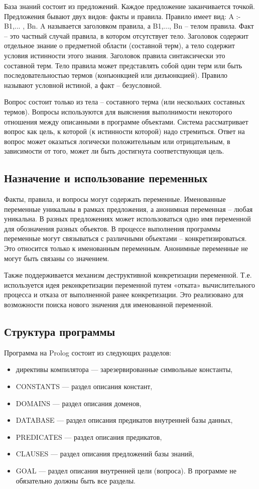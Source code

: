 \documentclass[a4paper,12pt]{article}
\begin{document}
База знаний состоит из предложений. Каждое предложение заканчивается точкой. Предложения бывают двух видов: факты и правила. Правило имеет вид: A :- B1,... , Bn. 
A называется заголовком правила, а B1,..., Bn – телом правила.
Факт – это частный случай правила, в котором отсутствует тело. Заголовок содержит отдельное знание о предметной области (составной терм), а тело содержит условия истинности этого знания. Заголовок правила синтаксически это составной терм. Тело правила может представлять собой один терм или быть последовательностью термов (конъюнкцией или дизъюнкцией). Правило называют условной истиной, а факт – безусловной.

Вопрос состоит только из тела – составного терма (или нескольких составных термов). Вопросы используются для выяснения выполнимости некоторого отношения между описанными в программе объектами. Система рассматривает вопрос как цель, к которой (к истинности которой) надо стремиться. Ответ на вопрос может оказаться логически положительным или отрицательным, в зависимости от того, может ли быть достигнута соответствующая цель.

\subsection*{Назначение и использование переменных}

Факты, правила, и вопросы могут содержать переменные. Именованные переменные уникальны в рамках предложения, а анонимная переменная – любая уникальна. В разных предложениях может использоваться одно имя переменной для обозначения разных объектов.
 В процессе выполнения программы переменные могут связываться с различными объектами – конкретизироваться. Это относится только к именованным переменным. Анонимные переменные не могут быть связаны со значением.

Также поддерживается механизм деструктивной конкретизации переменной. Т.е. используется идея реконкретизации переменной путем «отката» вычислительного процесса и отказа от выполненной ранее конкретизации. Это реализовано для возможности поиска нового значения для именованной переменной.

\subsection*{Структура программы}

Программа на Prolog состоит из следующих разделов:
\begin{itemize}
	\item директивы компилятора — зарезервированные символьные константы,
	\item CONSTANTS — раздел описания констант,
	\item DOMAINS — раздел описания доменов,
	\item DATABASE — раздел описания предикатов внутренней базы данных,
	\item PREDICATES — раздел описания предикатов,
	\item CLAUSES — раздел описания предложений базы знаний,
	\item GOAL — раздел описания внутренней цели (вопроса).
В программе не обязательно должны быть все разделы.
\end{itemize}
\end{document}
